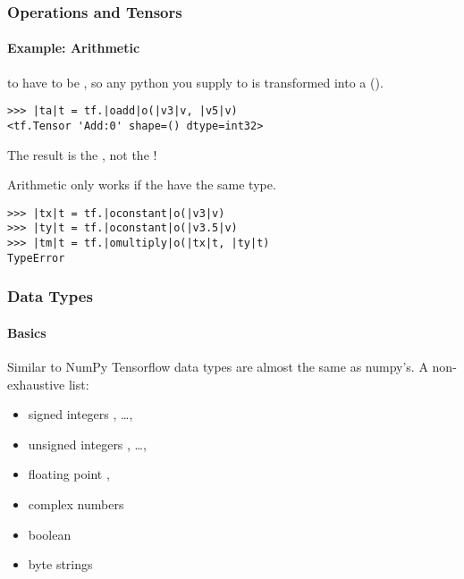 \begin{frame}[fragile]
    \frametitle{Operations and Tensors}
    \framesubtitle{Example: Arithmetic}
    \begin{block}{}
         to  have to be , so any python  you supply
        to  is transformed into a  (). 
        \begin{lstlisting}
>>> |ta|t = tf.|oadd|o(|v3|v, |v5|v)
<tf.Tensor 'Add:0' shape=() dtype=int32>
        \end{lstlisting}
        \pause
        \vspace{2em}
        \centering
        \large
        The result is the , not the !
    \end{block}
    \pause
     \begin{block}{}
        Arithmetic only works if the  have the same type.
        \begin{lstlisting}
>>> |tx|t = tf.|oconstant|o(|v3|v)
>>> |ty|t = tf.|oconstant|o(|v3.5|v)
>>> |tm|t = tf.|omultiply|o(|tx|t, |ty|t)
TypeError
        \end{lstlisting}
    \end{block}
\end{frame}

\begin{frame}
    \frametitle{Data Types}
    \framesubtitle{Basics}
    \begin{block}{Similar to NumPy}
        Tensorflow data types are almost the same as numpy's. 
        A non-exhaustive list:
        \begin{itemize}
            \item signed integers , \ldots, 
            \item unsigned integers , \ldots, 
            \item floating point , 
            \item complex numbers 
            \item boolean 
            \item byte strings 
        \end{itemize}
    \end{block}
\end{frame}


